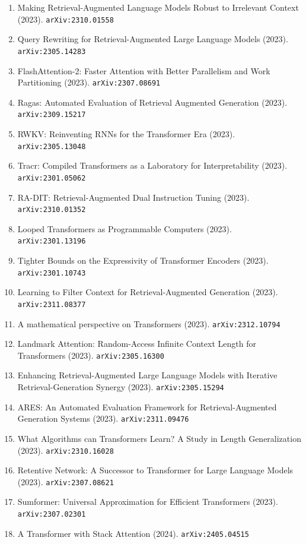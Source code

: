 \documentclass[11pt]{article}
\begin{document}
\begin{enumerate}
  \item Making Retrieval-Augmented Language Models Robust to Irrelevant Context (2023). \texttt{arXiv:2310.01558}
  \item Query Rewriting for Retrieval-Augmented Large Language Models (2023). \texttt{arXiv:2305.14283}
  \item FlashAttention-2: Faster Attention with Better Parallelism and Work
  Partitioning (2023). \texttt{arXiv:2307.08691}
  \item Ragas: Automated Evaluation of Retrieval Augmented Generation (2023). \texttt{arXiv:2309.15217}
  \item RWKV: Reinventing RNNs for the Transformer Era (2023). \texttt{arXiv:2305.13048}
  \item Tracr: Compiled Transformers as a Laboratory for Interpretability (2023). \texttt{arXiv:2301.05062}
  \item RA-DIT: Retrieval-Augmented Dual Instruction Tuning (2023). \texttt{arXiv:2310.01352}
  \item Looped Transformers as Programmable Computers (2023). \texttt{arXiv:2301.13196}
  \item Tighter Bounds on the Expressivity of Transformer Encoders (2023). \texttt{arXiv:2301.10743}
  \item Learning to Filter Context for Retrieval-Augmented Generation (2023). \texttt{arXiv:2311.08377}
  \item A mathematical perspective on Transformers (2023). \texttt{arXiv:2312.10794}
  \item Landmark Attention: Random-Access Infinite Context Length for
  Transformers (2023). \texttt{arXiv:2305.16300}
  \item Enhancing Retrieval-Augmented Large Language Models with Iterative
  Retrieval-Generation Synergy (2023). \texttt{arXiv:2305.15294}
  \item ARES: An Automated Evaluation Framework for Retrieval-Augmented
  Generation Systems (2023). \texttt{arXiv:2311.09476}
  \item What Algorithms can Transformers Learn? A Study in Length Generalization (2023). \texttt{arXiv:2310.16028}
  \item Retentive Network: A Successor to Transformer for Large Language Models (2023). \texttt{arXiv:2307.08621}
  \item Sumformer: Universal Approximation for Efficient Transformers (2023). \texttt{arXiv:2307.02301}
  \item A Transformer with Stack Attention (2024). \texttt{arXiv:2405.04515}

\end{enumerate}
\end{document}

